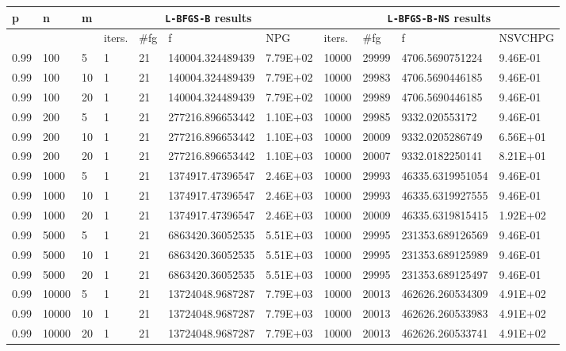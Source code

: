 \begin{table}
  \tiny
  \begin{center}
    \begin{tabular}{|l|l|l|l|l|l|l|l|l|l|l|}
      \hline
      p  & n & m  & \multicolumn{4}{|c|}{\texttt{L-BFGS-B} results} & \multicolumn{4}{|c|}{\texttt{L-BFGS-B-NS} results} \\ \hline
      &  &  & iters. & \#fg & f & NPG & iters. & \#fg & f & NSVCHPG \\ \hline
      0.99 & 100 & 5 & 1 & 21 & 140004.324489439 & 7.79E+02 & 10000 & 29999 & 4706.5690751224 & 9.46E-01\\
      0.99 & 100 & 10 & 1 & 21 & 140004.324489439 & 7.79E+02 & 10000 & 29983 & 4706.5690446185 & 9.46E-01\\
      0.99 & 100 & 20 & 1 & 21 & 140004.324489439 & 7.79E+02 & 10000 & 29989 & 4706.5690446185 & 9.46E-01\\
      0.99 & 200 & 5 & 1 & 21 & 277216.896653442 & 1.10E+03 & 10000 & 29985 & 9332.020553172 & 9.46E-01\\
      0.99 & 200 & 10 & 1 & 21 & 277216.896653442 & 1.10E+03 & 10000 & 20009 & 9332.0205286749 & 6.56E+01\\
      0.99 & 200 & 20 & 1 & 21 & 277216.896653442 & 1.10E+03 & 10000 & 20007 & 9332.0182250141 & 8.21E+01\\
      0.99 & 1000 & 5 & 1 & 21 & 1374917.47396547 & 2.46E+03 & 10000 & 29993 & 46335.6319951054 & 9.46E-01\\
      0.99 & 1000 & 10 & 1 & 21 & 1374917.47396547 & 2.46E+03 & 10000 & 29993 & 46335.6319927555 & 9.46E-01\\
      0.99 & 1000 & 20 & 1 & 21 & 1374917.47396547 & 2.46E+03 & 10000 & 20009 & 46335.6319815415 & 1.92E+02\\
      0.99 & 5000 & 5 & 1 & 21 & 6863420.36052535 & 5.51E+03 & 10000 & 29995 & 231353.689126569 & 9.46E-01\\
      0.99 & 5000 & 10 & 1 & 21 & 6863420.36052535 & 5.51E+03 & 10000 & 29995 & 231353.689125989 & 9.46E-01\\
      0.99 & 5000 & 20 & 1 & 21 & 6863420.36052535 & 5.51E+03 & 10000 & 29995 & 231353.689125497 & 9.46E-01\\
      0.99 & 10000 & 5 & 1 & 21 & 13724048.9687287 & 7.79E+03 & 10000 & 20013 & 462626.260534309 & 4.91E+02\\
      0.99 & 10000 & 10 & 1 & 21 & 13724048.9687287 & 7.79E+03 & 10000 & 20013 & 462626.260533983 & 4.91E+02\\
      0.99 & 10000 & 20 & 1 & 21 & 13724048.9687287 & 7.79E+03 & 10000 & 20013 & 462626.260533741 & 4.91E+02\\

\end{tabular}
\end{center}
\end{table}
